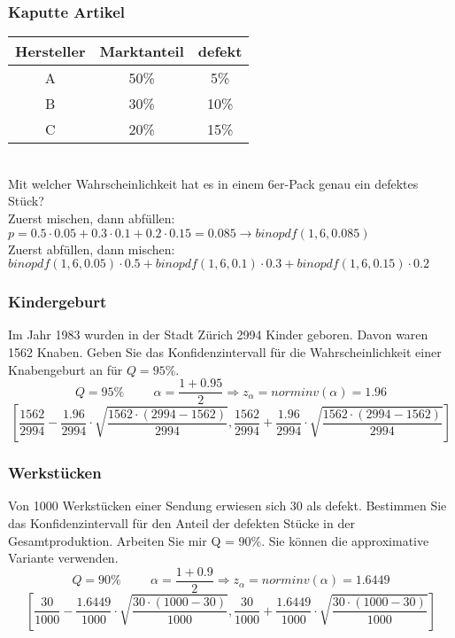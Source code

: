 \documentclass[landscape,twocolumn,a4paper]{article}
\begin{document}
\subsubsection*{Kaputte Artikel}
\begin{tabular}{c c c}
	Hersteller & Marktanteil & defekt \\
	\hline
	A & 50\% & 5\% \\
	B & 30\% & 10\% \\
	C & 20\% & 15\%
\end{tabular} \\
Mit welcher Wahrscheinlichkeit hat es in einem 6er-Pack genau ein defektes Stück? \\
Zuerst mischen, dann abfüllen: \\
$p = 0.5 \cdot 0.05 + 0.3 \cdot 0.1 + 0.2 \cdot 0.15 = 0.085 \rightarrow binopdf(1,6,0.085)$\\
Zuerst abfüllen, dann mischen: \\
$binopdf(1,6,0.05) \cdot 0.5 + binopdf(1,6,0.1) \cdot 0.3 + binopdf(1,6,0.15) \cdot 0.2$

\subsubsection*{Kindergeburt}
Im Jahr 1983 wurden in der Stadt Zürich 2994 Kinder geboren. Davon waren 1562 Knaben. Geben Sie das Konfidenzintervall für die Wahrscheinlichkeit einer Knabengeburt an für $Q=95\%$.
\begin{equation*}
	Q=95\% \hspace{1cm} \alpha = \frac{1 + 0.95}{2} \Rightarrow z_\alpha=norminv(\alpha) = 1.96
\end{equation*}
\begin{equation*}
	\left[ \frac{1562}{2994} - \frac{1.96}{2994} \cdot \sqrt{\frac{1562 \cdot (2994 - 1562)}{2994}} , \frac{1562}{2994} + \frac{1.96}{2994} \cdot \sqrt{\frac{1562 \cdot (2994 - 1562)}{2994}} \right]
\end{equation*}

\subsubsection*{Werkstücken}
Von 1000 Werkstücken einer Sendung erwiesen sich 30 als defekt. Bestimmen Sie das Konfidenzintervall für den Anteil der defekten Stücke in der Gesamtproduktion. Arbeiten Sie mir Q = 90\%. Sie können die approximative Variante verwenden.
\begin{equation*}
	Q=90\% \hspace{1cm} \alpha = \frac{1 + 0.9}{2} \Rightarrow z_\alpha=norminv(\alpha) = 1.6449
\end{equation*}
\begin{equation*}
	\left[ \frac{30}{1000} - \frac{1.6449}{1000} \cdot \sqrt{\frac{30 \cdot (1000 - 30)}{1000}} , \frac{30}{1000} + \frac{1.6449}{1000} \cdot \sqrt{\frac{30 \cdot (1000 - 30)}{1000}} \right]
\end{equation*}
\end{document}
